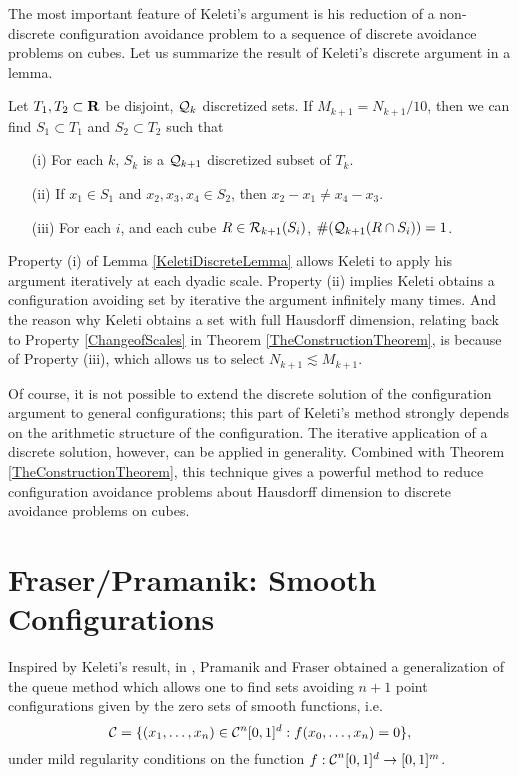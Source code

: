 The most important feature of Keleti's argument is his reduction of a non-discrete configuration avoidance problem to a sequence of discrete avoidance problems on cubes. Let us summarize the result of Keleti's discrete argument in a lemma.

\begin{lemma} \label{KeletiDiscreteLemma}
    Let $T_1, T_2 \subset \operatorname{\mathbf{R}}$ be disjoint, $\operatorname{\mathcal{Q}}_k$ discretized sets. If $M_{k+1} = N_{k+1}/10$, then we can find $S_1 \subset T_1$ and $S_2 \subset T_2$ such that
    \begin{enumerate}
        \item[(i)] For each $k$, $S_k$ is a $\operatorname{\mathcal{Q}}_{k+1}$ discretized subset of $T_k$.
        \item[(ii)] If $x_1 \in S_1$ and $x_2,x_3,x_4 \in S_2$, then $x_2 - x_1 \neq x_4 - x_3$.
        \item[(iii)] For each $i$, and each cube $R \in \operatorname{\mathcal{R}}_{k+1}(S_i)$, $\#(\operatorname{\mathcal{Q}}_{k+1}(R \cap S_i)) = 1$.
    \end{enumerate}
\end{lemma}
%
Property (i) of Lemma \ref{KeletiDiscreteLemma} allows Keleti to apply his argument iteratively at each dyadic scale. Property (ii) implies Keleti obtains a configuration avoiding set by iterative the argument infinitely many times. And the reason why Keleti obtains a set with full Hausdorff dimension, relating back to Property \ref{ChangeofScales} in Theorem \ref{TheConstructionTheorem}, is because of Property (iii), which allows us to select $N_{k+1} \lesssim M_{k+1}$.

Of course, it is not possible to extend the discrete solution of the configuration argument to general configurations; this part of Keleti's method strongly depends on the arithmetic structure of the configuration. The iterative application of a discrete solution, however, can be applied in generality. Combined with Theorem \ref{TheConstructionTheorem}, this technique gives a powerful method to reduce configuration avoidance problems about Hausdorff dimension to discrete avoidance problems on cubes.







\section{Fraser/Pramanik: Smooth Configurations}

Inspired by Keleti's result, in \cite{MalabikaRob}, Pramanik and Fraser obtained a generalization of the queue method which allows one to find sets avoiding $n+1$ point configurations given by the zero sets of smooth functions, i.e.
%
\[ \operatorname{\mathcal{C}} = \{ (x_1, \dots, x_n) \in \operatorname{\mathcal{C}}^n[0,1]^d : f(x_0, \dots, x_n) = 0 \}, \]
%
under mild regularity conditions on the function $f: \operatorname{\mathcal{C}}^n[0,1]^d \to [0,1]^m$.

